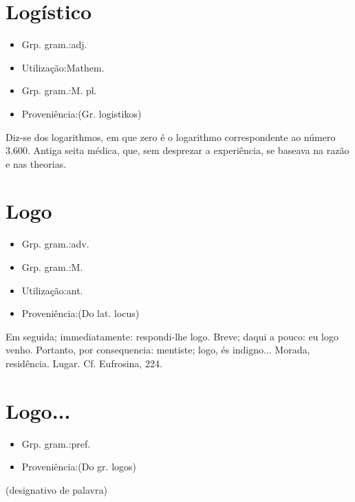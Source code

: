 \section{Logístico}
\begin{itemize}
\item {Grp. gram.:adj.}
\end{itemize}
\begin{itemize}
\item {Utilização:Mathem.}
\end{itemize}
\begin{itemize}
\item {Grp. gram.:M. pl.}
\end{itemize}
\begin{itemize}
\item {Proveniência:(Gr. \textunderscore logistikos\textunderscore )}
\end{itemize}
Diz-se dos logarithmos, em que zero é o logarithmo correspondente ao número 3.600.
Antiga seita médica, que, sem desprezar a experiência, se baseava na razão e nas theorias.
\section{Logo}
\begin{itemize}
\item {Grp. gram.:adv.}
\end{itemize}
\begin{itemize}
\item {Grp. gram.:M.}
\end{itemize}
\begin{itemize}
\item {Utilização:ant.}
\end{itemize}
\begin{itemize}
\item {Proveniência:(Do lat. \textunderscore locus\textunderscore )}
\end{itemize}
Em seguida; immediatamente: \textunderscore respondi-lhe logo\textunderscore .
Breve; daqui a pouco: \textunderscore eu logo venho\textunderscore .
Portanto, por consequencia: \textunderscore mentiste; logo, és indigno...\textunderscore 
Morada, residência.
Lugar. Cf. \textunderscore Eufrosina\textunderscore , 224.
\section{Logo...}
\begin{itemize}
\item {Grp. gram.:pref.}
\end{itemize}
\begin{itemize}
\item {Proveniência:(Do gr. \textunderscore logos\textunderscore )}
\end{itemize}
(designativo de \textunderscore palavra\textunderscore )
